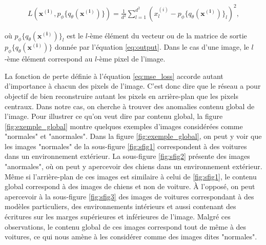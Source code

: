 \begin{gather} \label{eq:mse_loss}
L(\boldsymbol{x^{(i)}}, p_\phi\{q_\theta(\boldsymbol{x^{(i)}})\}) = \frac{1}{d^2} \sum_{l=1}^{d^2} (x^{(i)}_{l} - p_\phi\{q_\theta(\boldsymbol{x^{(i)}})\}_l)^2,
\end{gather}

où $p_\phi\{q_\theta(\boldsymbol{x^{(i)}})\}_l$ est le $l$-ème élément du vecteur ou de la matrice de sortie $p_\phi\{q_\theta(\boldsymbol{x^{(i)}})\}$ donnée par l'équation \ref{eq:output}. Dans le cas d'une image, le $l$-ème élément correspond au $l$-ème  pixel de l'image.

La fonction de perte définie à l'équation \ref{eq:mse_loss} accorde autant d'importance à chacun des pixels de l'image. C'est donc dire que le réseau a pour objectif de bien reconstruire autant les pixels en arrière-plan que les pixels centraux. Dans notre cas,  on cherche à trouver des anomalies \DIFdelbegin {}\DIFdelend \DIFaddbegin {}\DIFaddend contenu global de l'image. Pour illustrer ce qu'on veut dire par contenu global, la figure \ref{fig:exemple_global} montre quelques exemples d'images considérées comme "normales" et "anormales". Dans la figure \ref{fig:exemple_global}, on peut y voir que les images "normales" de la sous-figure \ref{fig:sfig1} correspondent à des voitures dans un environnement extérieur. La sous-figure \ref{fig:sfig2} présente des images "anormales", où on peut y apercevoir des chiens dans un environnement extérieur. Même si l'arrière-plan de ces images est similaire à celui de \ref{fig:sfig1}, le contenu global correspond à des images de chiens et non de voiture. À l'opposé, on peut apercevoir à la sous-figure \ref{fig:sfig3} des images de voitures correspondant à des modèles particuliers, des environnements intérieurs et aussi contenant des écritures sur les marges supérieures et inférieures de l'image. Malgré ces observations, le contenu global de ces images correspond tout de même à des voitures, ce qui nous amène à les considérer comme des images dites "normales".


